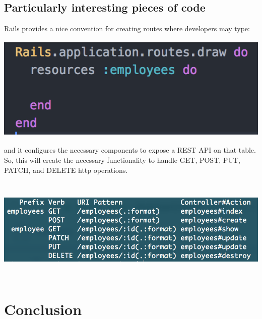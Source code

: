 \documentclass[draftclsnofoot,onecolumn,letterpaper,10pt,compsoc]{IEEEtran}
\begin{document}
\subsection{Particularly interesting pieces of code}
Rails provides a nice convention for creating routes where developers may type:

\centerline{\includegraphics[height=5cm]{screenshots/routesrb.png}}

and it configures the necessary components to expose a REST API on that table.
So, this will create the necessary functionality to handle GET, POST, PUT, PATCH, and DELETE http operations.

\centerline{\includegraphics[height=5cm]{screenshots/showroutes.png}}

\section{Conclusion}
\end{document}
